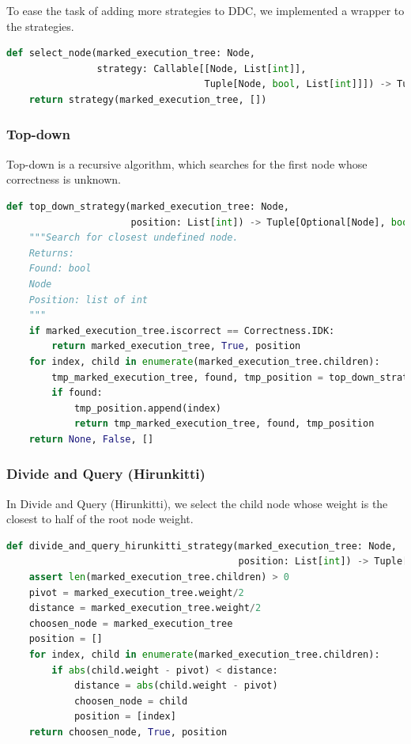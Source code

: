 To ease the task of adding more strategies to DDC, we implemented a wrapper to the strategies.
\begin{lstlisting}[language=Python, caption=Select node implementation]
def select_node(marked_execution_tree: Node,
                strategy: Callable[[Node, List[int]],
                                   Tuple[Node, bool, List[int]]]) -> Tuple[Node, bool, List[int]]:
    return strategy(marked_execution_tree, [])
\end{lstlisting}
\subsubsection{Top-down}
Top-down is a recursive algorithm, which searches for the first node whose correctness is unknown.
\begin{lstlisting}[language=Python, caption=Top-down strategy implementation]
def top_down_strategy(marked_execution_tree: Node,
                      position: List[int]) -> Tuple[Optional[Node], bool, List[int]]:
    """Search for closest undefined node.
    Returns:
    Found: bool
    Node
    Position: list of int
    """
    if marked_execution_tree.iscorrect == Correctness.IDK:
        return marked_execution_tree, True, position
    for index, child in enumerate(marked_execution_tree.children):
        tmp_marked_execution_tree, found, tmp_position = top_down_strategy(child, position)
        if found:
            tmp_position.append(index)
            return tmp_marked_execution_tree, found, tmp_position
    return None, False, []
\end{lstlisting}
\subsubsection{Divide and Query (Hirunkitti)}
In Divide and Query (Hirunkitti), we select the child node whose weight is the closest to half of the root node weight.
\begin{lstlisting}[language=Python, caption=Divide and Query (Hirunkitti) strategy implementation]
def divide_and_query_hirunkitti_strategy(marked_execution_tree: Node,
                                         position: List[int]) -> Tuple[Node, bool, List[int]]:
    assert len(marked_execution_tree.children) > 0
    pivot = marked_execution_tree.weight/2
    distance = marked_execution_tree.weight/2
    choosen_node = marked_execution_tree
    position = []
    for index, child in enumerate(marked_execution_tree.children):
        if abs(child.weight - pivot) < distance:
            distance = abs(child.weight - pivot)
            choosen_node = child
            position = [index]
    return choosen_node, True, position
\end{lstlisting}
